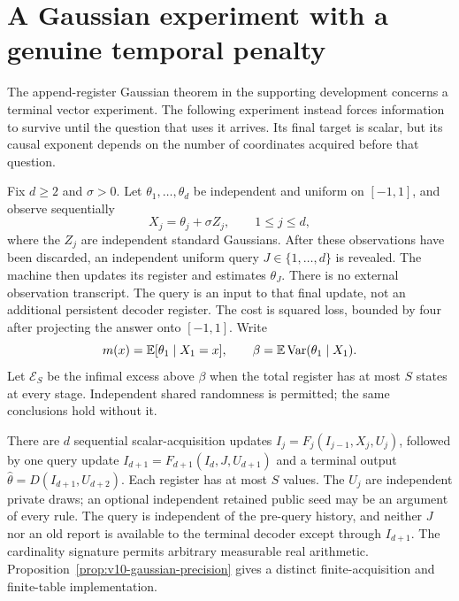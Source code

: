 \section{A Gaussian experiment with a genuine temporal penalty}
\label{sec:v9-delayed}
The append-register Gaussian theorem in the supporting development
concerns a terminal vector experiment. The following experiment instead
forces information to survive until the question that uses it arrives.
Its final target is scalar, but its causal exponent depends on the
number of coordinates acquired before that question.

Fix $d\ge2$ and $\sigma>0$. Let $\theta_1,\ldots,\theta_d$ be independent
and uniform on $[-1,1]$, and observe sequentially
\[
                  X_j=\theta_j+\sigma Z_j,\qquad 1\le j\le d,
\]
where the $Z_j$ are independent standard Gaussians. After these
observations have been discarded, an independent uniform query
$J\in\{1,\ldots,d\}$ is revealed. The machine then updates its register
and estimates $\theta_J$. There is no external observation transcript.
The query is an input to that final update, not an additional persistent
decoder register. The cost is squared loss, bounded by four after
projecting the answer onto $[-1,1]$. Write
\[
 m(x)=\mathbb E[\theta_1\mid X_1=x],\qquad
 \beta=\mathbb E\operatorname{Var}(\theta_1\mid X_1).
\]
Let $\mathcal E_S$ be the infimal excess above $\beta$ when the total
register has at most $S$ states at every stage. Independent shared
randomness is permitted; the same conclusions hold without it.

\begin{definition}\label{def:v10-gaussian-signature}
There are $d$ sequential scalar-acquisition updates
$I_j=F_j(I_{j-1},X_j,U_j)$, followed by one query update
$I_{d+1}=F_{d+1}(I_d,J,U_{d+1})$ and a terminal output
$\widehat\theta=D(I_{d+1},U_{d+2})$. Each register has at most $S$
values. The $U_j$ are independent private draws; an optional
independent retained public seed may be an argument of every rule.
The query is independent of the pre-query history, and neither $J$
nor an old report is available to the terminal decoder except through
$I_{d+1}$. The cardinality signature permits arbitrary measurable
real arithmetic. Proposition~\ref{prop:v10-gaussian-precision} gives
a distinct finite-acquisition and finite-table implementation.
\end{definition}

